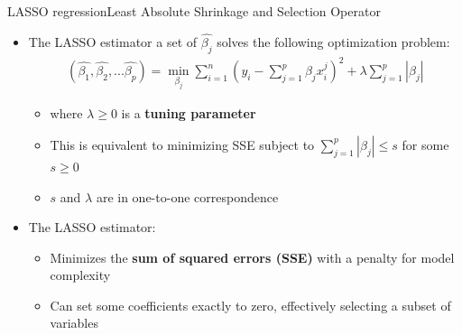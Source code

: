 \documentclass[dvipsnames,hyperref={pdfpagelabels=false}]{beamer}
\begin{document}
	\begin{frame}{LASSO regression}{Least Absolute Shrinkage and Selection Operator}
		\begin{itemize}
			
	\item The LASSO estimator a set of $\hat{\beta_{j}}$ solves the following optimization problem:
	\vspace{0.2cm}
	\begin{eqnarray*}
			(\hat{\beta_{1}},\hat{\beta_{2}},...\hat{\beta_{p}})=\min_{\beta_{j}} \sum^{n}_{i=1} (y_{i} - \sum^{p}_{j=1} \beta_{j} x^{j}_{i})^{2} + \lambda \sum^{p}_{j=1} |\beta_{j}|
	\end{eqnarray*}
	
	\begin{itemize}
		\vspace{0.2cm}
		\item where $\lambda \geq 0$ is a \textbf{tuning parameter}
		\vspace{0.2cm}
		\item This is equivalent to minimizing SSE subject to 
$\sum^{p}_{j=1} |\beta_{j}| \leq s$ for some $s \geq 0$ 
		\vspace{0.2cm}

\item $s$ and $\lambda$ are in one-to-one correspondence
        
	\end{itemize}
			\vspace{0.2cm}
	\item The LASSO estimator:
	\begin{itemize}
		\vspace{0.2cm}
		\item Minimizes the \textbf{sum of squared errors (SSE)} with a penalty for model complexity
		\vspace{0.2cm}
		\item Can set some coefficients exactly to zero, effectively selecting a subset of variables
	\end{itemize}

\end{itemize}
\end{frame}
	
	
\end{document}
